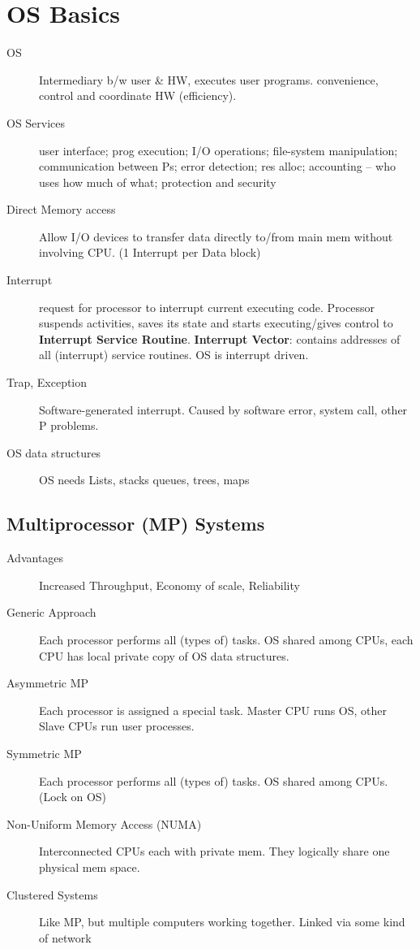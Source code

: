 \section*{OS Basics}
\begin{description}
  \item[OS] Intermediary b/w user \& HW, executes user programs. convenience, control and coordinate HW  (efficiency).
  \item[OS Services] user interface; prog execution; I/O operations; file-system manipulation; communication between Ps; error detection; res alloc; accounting – who uses how much of what; protection and security
  \item[Direct Memory access] Allow I/O devices to transfer data directly to/from main mem without involving CPU. (1 Interrupt per Data block) %
  \item[Interrupt] request for processor to interrupt current executing code. Processor suspends activities, saves its state and starts executing/gives control to \textbf{Interrupt Service Routine}. \textbf{Interrupt Vector}: contains addresses of all (interrupt) service routines. OS is interrupt driven.
  \item[Trap, Exception] Software-generated interrupt. Caused by software error, system call, other P problems.
  \item[OS data structures] OS needs Lists, stacks queues, trees, maps
\end{description}

\subsection*{Multiprocessor (MP) Systems}
\begin{description}
\item[Advantages]Increased Throughput, Economy of scale, Reliability
  \item[Generic Approach] Each processor performs all (types of) tasks. OS shared among CPUs, each CPU has local private copy of OS data structures.
  \item[Asymmetric MP] Each processor is assigned a special task. Master CPU runs OS, other Slave CPUs run user processes.
  \item[Symmetric MP] Each processor performs all (types of) tasks. OS shared among CPUs. (Lock on OS)
  \item[Non-Uniform Memory Access (NUMA)] Interconnected CPUs each with private mem. They logically share one physical mem space.
  \item[Clustered Systems] Like MP, but multiple computers working together. Linked via some kind of network %
\end{description}

